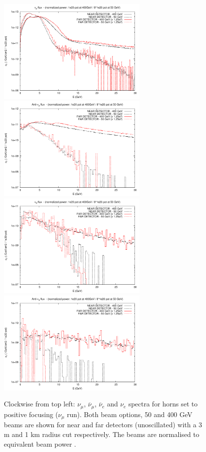 \begin{figure}[hbtp]
	\begin{center}
		\includegraphics[width=74mm]{Chapter2/figures/numu_ND_FD.pdf}
		\includegraphics[width=74mm]{Chapter2/figures/anumu_ND_FD.pdf}
		\includegraphics[width=74mm]{Chapter2/figures/nue_ND_FD.pdf}
		\includegraphics[width=74mm]{Chapter2/figures/anue_ND_FD.pdf}
	\caption{Clockwise from top left: $\nu_{\mu}$, $\overline{\nu}_{\mu}$, $\overline{\nu}_e$ and $\nu_e$ spectra for horns set to positive focusing ($\nu_{\mu}$ run). Both beam options, 50 and 400 GeV beams are shown for near and far detectors (unoscillated) with a 3 m and 1 km radius cut respectively. The beams are normalised to equivalent beam power \cite{lbnoInternal}\cite{lbnoNDTechNote}.}
	\label{fig:neutrinoFluxNearAndFar}
\end{center}
\end{figure}

